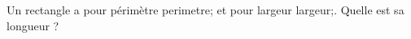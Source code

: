 \documentclass[exercice]{thedocument}%
\begin{document}
%
Un rectangle a pour périmètre \<perimetre; et pour largeur \<largeur;.\vskip5pt
Quelle est sa longueur ?
\end{document}
